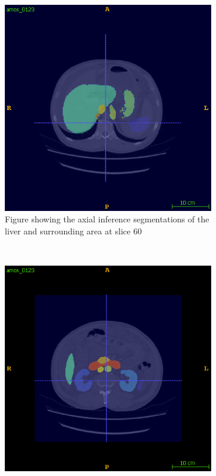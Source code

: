 \documentclass{l4proj}
\begin{document}
\begin{figure}[htb]
\begin{subfigure}[b]{0.45\textwidth}
        \includegraphics[width=\textwidth]{images/liver_inf_1.png}
        \caption{Figure showing the axial inference segmentations of the liver and surrounding area at slice $60$}
        \label{fig:full_scan_example_results_liver_inf_1}
    \end{subfigure} \\
    \begin{subfigure}[b]{0.45\textwidth}
        \includegraphics[width=\textwidth]{images/kidneys_gt.png}

\end{subfigure}
\end{figure}
\end{document}
